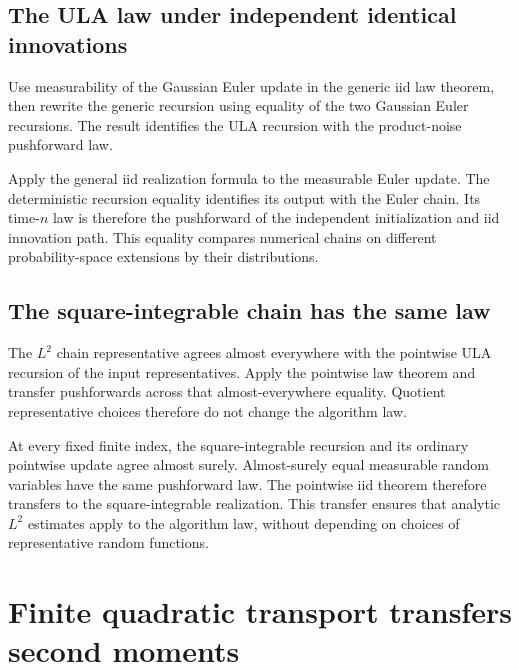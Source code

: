 \documentclass[11pt,a4paper]{report}
\begin{document}
\subsection{\texorpdfstring{The ULA law under independent identical innovations}{The ULA law under independent identical innovations}}
\label{report-step-UnadjustedLangevin-ChainLaw-lean-12}


Use measurability of the Gaussian Euler update in the generic iid law theorem, then rewrite the generic recursion using equality of the two Gaussian Euler recursions. The result identifies the ULA recursion with the product-noise pushforward law.



Apply the general iid realization formula to the measurable Euler update. The deterministic recursion equality identifies its output with the Euler chain. Its time-\(n\) law is therefore the pushforward of the independent initialization and iid innovation path. This equality compares numerical chains on different probability-space extensions by their distributions.

\subsection{\texorpdfstring{The square-integrable chain has the same law}{The square-integrable chain has the same law}}
\label{report-step-UnadjustedLangevin-ChainLaw-lean-13}


The \(L^2\) chain representative agrees almost everywhere with the pointwise ULA recursion of the input representatives. Apply the pointwise law theorem and transfer pushforwards across that almost-everywhere equality. Quotient representative choices therefore do not change the algorithm law.



At every fixed finite index, the square-integrable recursion and its ordinary pointwise update agree almost surely. Almost-surely equal measurable random variables have the same pushforward law. The pointwise iid theorem therefore transfers to the square-integrable realization. This transfer ensures that analytic \(L^2\) estimates apply to the algorithm law, without depending on choices of representative random functions.

\section{\texorpdfstring{Finite quadratic transport transfers second moments}{Finite quadratic transport transfers second moments}}
\label{proof-module-UnadjustedLangevin-TransportMoments-lean}
\end{document}
